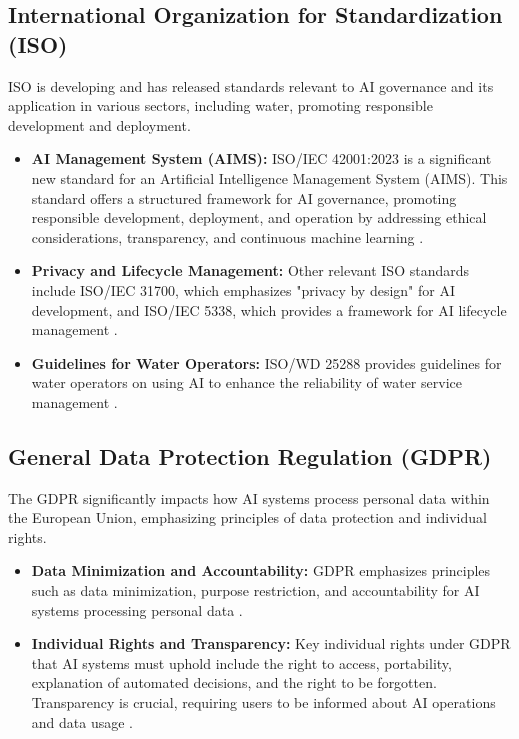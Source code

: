 \subsection{International Organization for Standardization (ISO)}
ISO is developing and has released standards relevant to AI governance and its application in various sectors, including water, promoting responsible development and deployment.
\begin{itemize}
    \item \textbf{AI Management System (AIMS):} ISO/IEC 42001:2023 is a significant new standard for an Artificial Intelligence Management System (AIMS). This standard offers a structured framework for AI governance, promoting responsible development, deployment, and operation by addressing ethical considerations, transparency, and continuous machine learning \cite{ISME_ISO, KPMG_ISO}.
    \item \textbf{Privacy and Lifecycle Management:} Other relevant ISO standards include ISO/IEC 31700, which emphasizes "privacy by design" for AI development, and ISO/IEC 5338, which provides a framework for AI lifecycle management \cite{SoftwareImprovementGroup_ISO, Kiwa_ISO}.
    \item \textbf{Guidelines for Water Operators:} ISO/WD 25288 provides guidelines for water operators on using AI to enhance the reliability of water service management \cite{WaldenEnvironmentalEngineering_ISO}.
\end{itemize}

\subsection{General Data Protection Regulation (GDPR)}
The GDPR significantly impacts how AI systems process personal data within the European Union, emphasizing principles of data protection and individual rights.
\begin{itemize}
    \item \textbf{Data Minimization and Accountability:} GDPR emphasizes principles such as data minimization, purpose restriction, and accountability for AI systems processing personal data \cite{Exabeam_GDPR, SecuritiAI_GDPR}.
    \item \textbf{Individual Rights and Transparency:} Key individual rights under GDPR that AI systems must uphold include the right to access, portability, explanation of automated decisions, and the right to be forgotten. Transparency is crucial, requiring users to be informed about AI operations and data usage \cite{Heuking_GDPR}.
\end{itemize}

